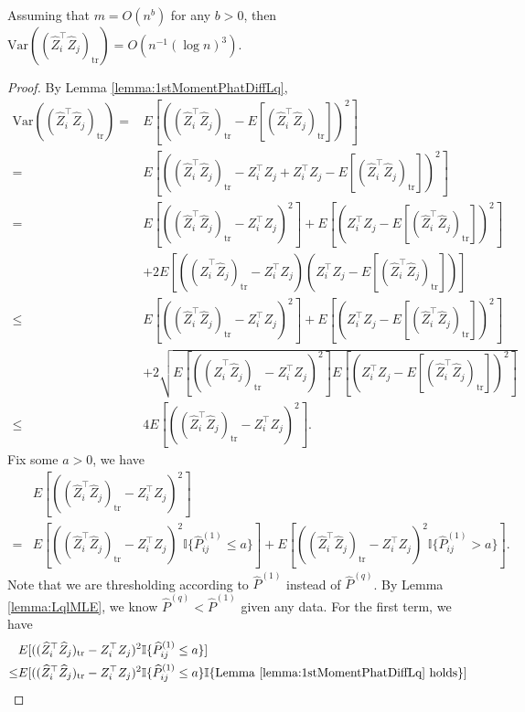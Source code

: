 \begin{theorem}
\label{thm:VarASELqproof}
Assuming that $m = O(n^b)$ for any $b > 0$, then $\mathrm{Var}((\hat{Z}_i^{\top} \hat{Z}_j)_{\mathrm{tr}}) = O(n^{-1} (\log n)^3)$.
\end{theorem}
\begin{proof}
By Lemma \ref{lemma:1stMomentPhatDiffLq},
\begin{align*}
	\mathrm{Var}((\hat{Z}_i^{\top} \hat{Z}_j)_{\mathrm{tr}})
    = & E[((\hat{Z}_i^{\top} \hat{Z}_j)_{\mathrm{tr}} - E[(\hat{Z}_i^{\top} \hat{Z}_j)_{\mathrm{tr}}])^2] \\
    = & E[((\hat{Z}_i^{\top} \hat{Z}_j)_{\mathrm{tr}} - Z_i^{\top} Z_j + Z_i^{\top} Z_j - E[(\hat{Z}_i^{\top} \hat{Z}_j)_{\mathrm{tr}}])^2] \\
    = & E[((\hat{Z}_i^{\top} \hat{Z}_j)_{\mathrm{tr}} - Z_i^{\top} Z_j)^2] + E[(Z_i^{\top} Z_j - E[(\hat{Z}_i^{\top} \hat{Z}_j)_{\mathrm{tr}}])^2] \\ 
    & + 2E[((\hat{Z}_i^{\top} \hat{Z}_j)_{\mathrm{tr}} - Z_i^{\top} Z_j)(Z_i^{\top} Z_j - E[(\hat{Z}_i^{\top} \hat{Z}_j)_{\mathrm{tr}}])] \\
    \le & E[((\hat{Z}_i^{\top} \hat{Z}_j)_{\mathrm{tr}} - Z_i^{\top} Z_j)^2] + E[(Z_i^{\top} Z_j - E[(\hat{Z}_i^{\top} \hat{Z}_j)_{\mathrm{tr}}])^2] \\ 
    & + 2\sqrt{E[((\hat{Z}_i^{\top} \hat{Z}_j)_{\mathrm{tr}} - Z_i^{\top} Z_j)^2] E[(Z_i^{\top} Z_j - E[(\hat{Z}_i^{\top} \hat{Z}_j)_{\mathrm{tr}}])^2]} \\
    \le & 4 E[((\hat{Z}_i^{\top} \hat{Z}_j)_{\mathrm{tr}} - Z_i^{\top} Z_j)^2].
\end{align*}
Fix some $a > 0$, we have
\begin{align*}
	& E[((\hat{Z}_i^{\top} \hat{Z}_j)_{\mathrm{tr}} - Z_i^{\top} Z_j)^2] \\
	= & E[((\hat{Z}_i^{\top} \hat{Z}_j)_{\mathrm{tr}} - Z_i^{\top} Z_j)^2 \mathbb{I}\{\hat{P}^{(1)}_{ij} \le a\}]
	+ E[((\hat{Z}_i^{\top} \hat{Z}_j)_{\mathrm{tr}} - Z_i^{\top} Z_j)^2 \mathbb{I}\{\hat{P}^{(1)}_{ij} > a\}].
\end{align*}
Note that we are thresholding according to $\hat{P}^{(1)}$ instead of $\hat{P}^{(q)}$. By Lemma \ref{lemma:LqlMLE}, we know $\hat{P}^{(q)} < \hat{P}^{(1)}$ given any data.
For the first term, we have
\begin{align*}
	& E[((\hat{Z}_i^{\top} \hat{Z}_j)_{\mathrm{tr}} - Z_i^{\top} Z_j)^2 \mathbb{I}\{\hat{P}^{(1)}_{ij} \le a\}] \\
	\le & E[((\hat{Z}_i^{\top} \hat{Z}_j)_{\mathrm{tr}} - Z_i^{\top} Z_j)^2 \mathbb{I}\{\hat{P}^{(1)}_{ij} \le a\} \mathbb{I}\{\mathrm{Lemma\ } \ref{lemma:1stMomentPhatDiffLq} \mathrm{\ holds}\}] \\

\end{align*}
\end{proof}
